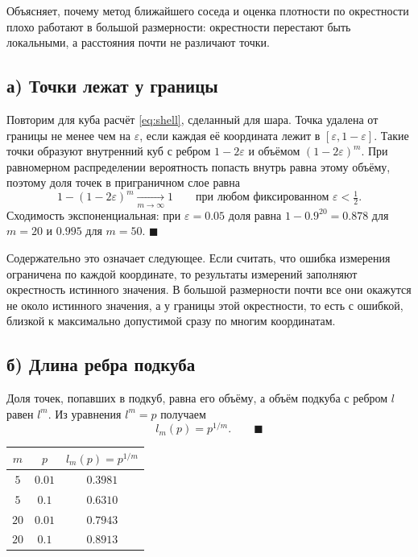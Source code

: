 \documentclass[12pt,a4paper]{article}
\begin{document}
\zachem Объясняет, почему метод ближайшего соседа и оценка плотности по
окрестности плохо работают в большой размерности: окрестности перестают быть
локальными, а расстояния почти не различают точки.

\subsection*{а) Точки лежат у границы}

\resh Повторим для куба расчёт \eqref{eq:shell}, сделанный для шара. Точка
удалена от границы не менее чем на $\varepsilon$, если каждая её координата
лежит в $[\varepsilon, 1-\varepsilon]$. Такие точки образуют внутренний куб с
ребром $1 - 2\varepsilon$ и объёмом $(1-2\varepsilon)^m$. При равномерном
распределении вероятность попасть внутрь равна этому объёму, поэтому доля точек
в приграничном слое равна
\[
  1 - (1 - 2\varepsilon)^m \xrightarrow[m \to \infty]{} 1
  \qquad\text{при любом фиксированном } \varepsilon < \tfrac12 .
\]
Сходимость экспоненциальная: при $\varepsilon = 0.05$ доля равна
$1 - 0.9^{20} = 0.878$ для $m = 20$ и $0.995$ для $m = 50$. $\blacksquare$

Содержательно это означает следующее. Если считать, что ошибка измерения
ограничена по каждой координате, то результаты измерений заполняют окрестность
истинного значения. В большой размерности почти все они окажутся не около
истинного значения, а у границы этой окрестности, то есть с ошибкой, близкой к
максимально допустимой сразу по многим координатам.

\subsection*{б) Длина ребра подкуба}

\resh Доля точек, попавших в подкуб, равна его объёму, а объём подкуба с ребром
$l$ равен $l^m$. Из уравнения $l^m = p$ получаем
\begin{equation}\label{eq:edge}
  l_m(p) = p^{1/m} . \qquad\blacksquare
\end{equation}

\begin{center}
\begin{tabular}{ccc}
\toprule
$m$ & $p$ & $l_m(p) = p^{1/m}$ \\
\midrule
$5$  & $0.01$ & $0.3981$ \\
$5$  & $0.1$  & $0.6310$ \\
$20$ & $0.01$ & $0.7943$ \\
$20$ & $0.1$  & $0.8913$ \\
\bottomrule
\end{tabular}
\end{center}
\end{document}
